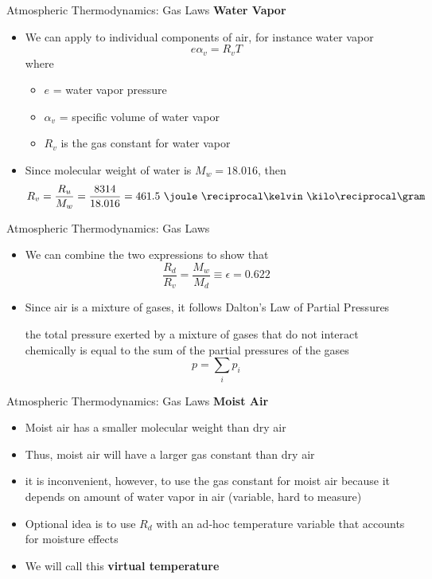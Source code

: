 \begin{frame}{Atmospheric Thermodynamics: Gas Laws}
\textbf{Water Vapor}
\begin{itemize}
	\item We can apply to individual components of air, for instance water vapor
	$$e \alpha_v = R_vT$$
	where
	\begin{itemize}
		\item $e$ = water vapor pressure
		\item $\alpha_v$ = specific volume of water vapor
		\item $R_v$ is the gas constant for water vapor
	\end{itemize}
	\item Since molecular weight of water is $M_w = 18.016$, then
	$$R_v = \frac{R_u}{M_w} = \frac{8314}{18.016} = 461.5\ \joule\ \reciprocal\kelvin\ \kilo\reciprocal\gram$$ 
	\end{itemize}
\end{frame}

\begin{frame}{Atmospheric Thermodynamics: Gas Laws}
\begin{itemize}
	\item We can combine the two expressions to show that
	$$\frac{R_d}{R_v} = \frac{M_w}{M_d} \equiv \epsilon = 0.622$$
	\item Since air is a mixture of gases, it follows Dalton's Law of Partial Pressures
	\begin{fancydefs}
		the total pressure exerted by a mixture of gases 
		that do not interact chemically is equal to the
		sum of the partial pressures of the gases
		$$p = \sum_i p_i$$
	\end{fancydefs}
	\end{itemize}
\end{frame}

\begin{frame}{Atmospheric Thermodynamics: Gas Laws}
\textbf{Moist Air}
\begin{itemize}
	\item Moist air has a smaller molecular weight than dry air
	\item Thus, moist air will have a larger gas constant than dry air
	\item it is inconvenient, however, to use the gas constant for moist air because it depends on amount of water vapor in air (variable, hard to measure)
	\item Optional idea is to use $R_d$ with an ad-hoc temperature variable that accounts for moisture effects
	\item We will call this \textbf{virtual temperature}
	\end{itemize}
\end{frame}

